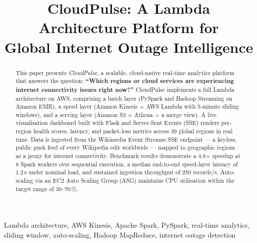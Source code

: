 \documentclass[conference]{IEEEtran}
\begin{document}
\title{CloudPulse: A Lambda Architecture Platform for\\
Global Internet Outage Intelligence}

\author{
\and
{}
}

\maketitle

\begin{abstract}
This paper presents \textit{CloudPulse}, a scalable, cloud-native real-time analytics
platform that answers the question: \textbf{``Which regions or cloud services are
experiencing internet connectivity issues right now?''} CloudPulse implements a full
Lambda architecture on AWS, comprising a batch layer (PySpark and Hadoop Streaming
on Amazon EMR), a speed layer (Amazon Kinesis + AWS Lambda with 5-minute sliding
windows), and a serving layer (Amazon S3 + Athena + a merge view). A live
visualisation dashboard built with Flask and Server-Sent Events (SSE) renders
per-region health scores, latency, and packet-loss metrics across 39 global
regions in real time. Data is ingested from the Wikimedia Event Streams SSE
endpoint — a keyless, public push feed of every Wikipedia edit worldwide — mapped
to geographic regions as a proxy for internet connectivity. Benchmark results
demonstrate a 4.8$\times$ speedup at 8 Spark workers over sequential execution, a
median end-to-end speed-layer latency of 1.2\,s under nominal load, and sustained
ingestion throughput of 250 records/s. Auto-scaling via an EC2 Auto Scaling Group
(ASG) maintains CPU utilisation within the target range of 30--70\,\%.
\end{abstract}

\begin{IEEEkeywords}
Lambda architecture, AWS Kinesis, Apache Spark, PySpark, real-time analytics,
sliding window, auto-scaling, Hadoop MapReduce, internet outage detection
\end{IEEEkeywords}
\end{document}
